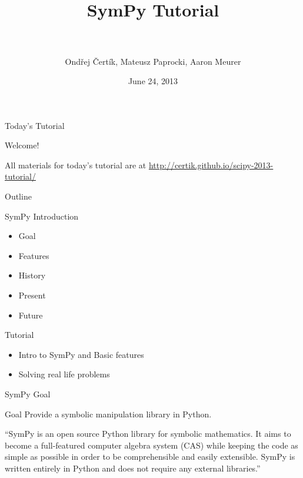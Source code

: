 \documentclass[xcolor=svgnames]{beamer}
\title[SymPy\hspace{4em}\insertframenumber/
\inserttotalframenumber]{~\\ SymPy Tutorial \\~}
\author[O. Čertík, M. Paprocki, A. Meurer]
{Ondřej Čertík, Mateusz Paprocki, Aaron Meurer}
\institute{\pgfuseimage{mylogo}}
\date{June 24, 2013}
\begin{document}
\begin{frame}
  \maketitle
\end{frame}

\begin{frame}{Today's Tutorial}
\begin{center}
\Huge Welcome!
\end{center}

\normalsize All materials for today's tutorial are at \url{http://certik.github.io/scipy-2013-tutorial/}

\end{frame}

\begin{frame}{Outline}
  \begin{block}{SymPy Introduction}
    \begin{itemize}
    \item Goal
    \item Features
    \item History
    \item Present
    \item Future
    \end{itemize}
  \end{block}

  \begin{block}{Tutorial}
    \begin{itemize}
    \item Intro to SymPy and Basic features
    \item Solving real life problems
    \end{itemize}
  \end{block}
\end{frame}

\begin{frame}{SymPy Goal}
  \begin{block}{Goal}
    Provide a symbolic manipulation library in Python.
  \end{block}
  \pause
  \begin{block}

    ``SymPy is an open source Python library for symbolic mathematics. It aims to
    become a full-featured computer algebra system (CAS) while keeping the code as
    simple as possible in order to be comprehensible and easily extensible. SymPy
    is written entirely in Python and does not require any external libraries.''

  \end{block}
\end{frame}
\end{document}
